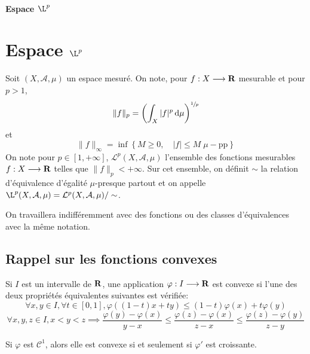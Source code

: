 \ifsolo
    ~

    \vspace{1cm}

    \begin{center}
        \textbf{\LARGE Espace \texorpdfstring{$\L^p$}{L^p}} \\[1em]
    \end{center}
    \tableofcontents
\else
    \chapter{Espace \texorpdfstring{$\L^p$}{L^p}}

    \minitoc
\fi
\thispagestyle{empty}

\begin{dfn}
    Soit $(X, \mathcal  A, \mu)$ un espace mesuré. On note, pour $f:X\longrightarrow \mathbf R$ mesurable et pour $p>1$, \[
        \|f\|_p= \left( \int_X |f|^p\mathop{}\!\mathrm d \mu\right)^{\sfrac1p}
    \]
    et \[
        \|f\|_{\infty}=\inf \left\{ M\geq 0, \quad  |f|\leq M \;\mu-\text{pp} \right\} 
    \]
    On note pour $p \in  [1, +\infty]$, $\mathcal  L^p(X, \mathcal A, \mu)$ l'ensemble des fonctions mesurables $f:X \longrightarrow \mathbf R$ telles que $\|f\|_p<+\infty$. Sur cet ensemble, on définit $\sim$ la relation d'équivalence d'égalité $\mu$-presque partout et on appelle $\L^p(X, \mathcal A, \mu)=\mathcal  L^p(X, \mathcal  A, \mu) / \sim$.
\end{dfn}

\begin{rem}
On travaillera indifféremment avec des fonctions ou des classes d'équivalences avec la même notation.
\end{rem}

\section{Rappel sur les fonctions convexes}

\begin{dfn}
Si $I$ est un intervalle de  $ \mathbf R$, une application $\varphi : I \longrightarrow  \mathbf R$ est convexe si l'une des deux propriétés équivalentes suivantes est vérifiée: \[
    \forall  x, y \in  I, \forall t \in  [0,1], \varphi((1-t)x+ty)\leq (1-t)\varphi(x)+t\varphi(y)
\]
\[
    \forall  x,y,z \in  I, x<y<z \implies \frac{\varphi(y)-\varphi(x)}{y-x}\leq \frac{\varphi(z)-\varphi(x)}{z-x}\leq \frac{\varphi(z)-\varphi(y)}{z-y}
\]
\end{dfn}

\begin{rem}
Si $\varphi$ est  $\mathcal  C^1$, alors elle est convexe si et seulement si $\varphi'$ est croissante.
\end{rem}

